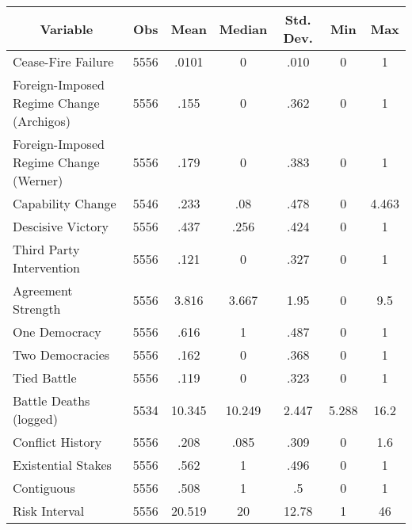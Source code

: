 \documentclass[letterpaper, 12pt]{article}
\let\originaltable\table
\let\endoriginaltable\endtable
\renewenvironment{table}[1][ht]{%
	\originaltable[#1]
	\centering}%
{\endoriginaltable}
\theoremstyle{plain}
\begin{document}
\begin{table}[htbp]\centering
	\caption{Descriptive Statistics for Cease-Fire Data}
	\label{tab:descLHR}
	\begin{tabular*}{6.5 in}{lcccccc}
		\hline\hline
		\multicolumn{1}{c}{Variable}  & Obs  & Mean   & Median & Std. Dev. & Min   & Max   \\ \hline
		Cease-Fire Failure            & 5556 & .0101  & 0      & .010      & 0     & 1     \\
		Foreign-Imposed Regime Change (Archigos) & 5556 & .155   & 0      & .362      & 0     & 1     \\
		Foreign-Imposed Regime Change (Werner) & 5556 & .179   & 0      & .383      & 0     & 1     \\
		Capability Change             & 5546 & .233   & .08    & .478      & 0     & 4.463 \\
		Descisive Victory             & 5556 & .437   & .256   & .424      & 0     & 1     \\
		Third Party Intervention      & 5556 & .121   & 0      & .327      & 0     & 1     \\
		Agreement Strength            & 5556 & 3.816  & 3.667  & 1.95      & 0     & 9.5   \\
		One Democracy                 & 5556 & .616   & 1      & .487      & 0     & 1     \\
		Two Democracies               & 5556 & .162   & 0      & .368      & 0     & 1     \\
		Tied Battle                   & 5556 & .119   & 0      & .323      & 0     & 1     \\
		Battle Deaths (logged)        & 5534 & 10.345 & 10.249 & 2.447     & 5.288 & 16.2  \\
		Conflict History              & 5556 & .208   & .085   & .309      & 0     & 1.6   \\
		Existential Stakes            & 5556 & .562   & 1      & .496      & 0     & 1     \\
		Contiguous                    & 5556 & .508   & 1      & .5        & 0     & 1     \\
		Risk Interval                 & 5556 & 20.519 & 20     & 12.78     & 1     & 46    \\ \hline
	\end{tabular*}
\end{table}
\end{document}
